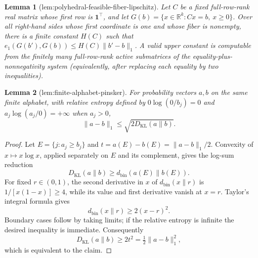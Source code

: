 \documentclass{article}
\newtheorem{lemma}{Lemma}
\begin{document}
\begin{lemma}[lem:polyhedral-feasible-fiber-lipschitz]\label{lem:polyhedral-feasible-fiber-lipschitz}
Let \(C\) be a fixed full-row-rank real matrix whose first row is \(\mathbf 1^\top\), and let \(G(b)=\{x\in\mathbb R^k:Cx=b,\ x\ge0\}\).  Over all right-hand sides whose first coordinate is one and whose fiber is nonempty, there is a finite constant \(H(C)\) such that \(e_1(G(b'),G(b))\le H(C)\|b'-b\|_1\).  A valid upper constant is computable from the finitely many full-row-rank active submatrices of the equality-plus-nonnegativity system (equivalently, after replacing each equality by two inequalities).
\end{lemma}

\begin{lemma}[lem:finite-alphabet-pinsker]\label{lem:finite-alphabet-pinsker}
For probability vectors \(a,b\) on the same finite alphabet, with relative entropy defined by \(0\log(0/b_j)=0\) and \(a_j\log(a_j/0)=+\infty\) when \(a_j>0\),
\[
\|a-b\|_1\le\sqrt{2D_{\mathrm{KL}}(a\|b)}.
\]
\end{lemma}
\begin{proof}
Let \(E=\{j:a_j\ge b_j\}\) and \(t=a(E)-b(E)=\|a-b\|_1/2\).  Convexity of \(x\mapsto x\log x\), applied separately on \(E\) and its complement, gives the log-sum reduction
\[
D_{\mathrm{KL}}(a\|b)\ge d_{\mathrm{bin}}(a(E)\|b(E)).
\]
For fixed \(r\in(0,1)\), the second derivative in \(x\) of \(d_{\mathrm{bin}}(x\|r)\) is \(1/[x(1-x)]\ge4\), while its value and first derivative vanish at \(x=r\).  Taylor's integral formula gives
\[
d_{\mathrm{bin}}(x\|r)\ge2(x-r)^2.
\]
Boundary cases follow by taking limits; if the relative entropy is infinite the desired inequality is immediate.  Consequently
\[
D_{\mathrm{KL}}(a\|b)\ge2t^2=\tfrac12\|a-b\|_1^2,
\]
which is equivalent to the claim.
\end{proof}
\end{document}
